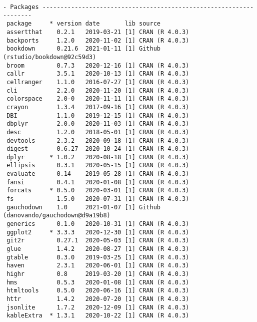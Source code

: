 \documentclass[twoside,12pt,final]{ucthesis-CA2012}
\begin{document}
\begin{ucmainmatter}
\begin{verbatim}
- Packages -------------------------------------------------------------------
 package     * version date       lib source                               
 assertthat    0.2.1   2019-03-21 [1] CRAN (R 4.0.3)                       
 backports     1.2.0   2020-11-02 [1] CRAN (R 4.0.3)                       
 bookdown      0.21.6  2021-01-11 [1] Github (rstudio/bookdown@92c59d3)    
 broom         0.7.3   2020-12-16 [1] CRAN (R 4.0.3)                       
 callr         3.5.1   2020-10-13 [1] CRAN (R 4.0.3)                       
 cellranger    1.1.0   2016-07-27 [1] CRAN (R 4.0.3)                       
 cli           2.2.0   2020-11-20 [1] CRAN (R 4.0.3)                       
 colorspace    2.0-0   2020-11-11 [1] CRAN (R 4.0.3)                       
 crayon        1.3.4   2017-09-16 [1] CRAN (R 4.0.3)                       
 DBI           1.1.0   2019-12-15 [1] CRAN (R 4.0.3)                       
 dbplyr        2.0.0   2020-11-03 [1] CRAN (R 4.0.3)                       
 desc          1.2.0   2018-05-01 [1] CRAN (R 4.0.3)                       
 devtools      2.3.2   2020-09-18 [1] CRAN (R 4.0.3)                       
 digest        0.6.27  2020-10-24 [1] CRAN (R 4.0.3)                       
 dplyr       * 1.0.2   2020-08-18 [1] CRAN (R 4.0.3)                       
 ellipsis      0.3.1   2020-05-15 [1] CRAN (R 4.0.3)                       
 evaluate      0.14    2019-05-28 [1] CRAN (R 4.0.3)                       
 fansi         0.4.1   2020-01-08 [1] CRAN (R 4.0.3)                       
 forcats     * 0.5.0   2020-03-01 [1] CRAN (R 4.0.3)                       
 fs            1.5.0   2020-07-31 [1] CRAN (R 4.0.3)                       
 gauchodown    1.0     2021-01-07 [1] Github (danovando/gauchodown@d9a19b8)
 generics      0.1.0   2020-10-31 [1] CRAN (R 4.0.3)                       
 ggplot2     * 3.3.3   2020-12-30 [1] CRAN (R 4.0.3)                       
 git2r         0.27.1  2020-05-03 [1] CRAN (R 4.0.3)                       
 glue          1.4.2   2020-08-27 [1] CRAN (R 4.0.3)                       
 gtable        0.3.0   2019-03-25 [1] CRAN (R 4.0.3)                       
 haven         2.3.1   2020-06-01 [1] CRAN (R 4.0.3)                       
 highr         0.8     2019-03-20 [1] CRAN (R 4.0.3)                       
 hms           0.5.3   2020-01-08 [1] CRAN (R 4.0.3)                       
 htmltools     0.5.0   2020-06-16 [1] CRAN (R 4.0.3)                       
 httr          1.4.2   2020-07-20 [1] CRAN (R 4.0.3)                       
 jsonlite      1.7.2   2020-12-09 [1] CRAN (R 4.0.3)                       
 kableExtra  * 1.3.1   2020-10-22 [1] CRAN (R 4.0.3)                       

\end{verbatim}
\end{ucmainmatter}
\end{document}
